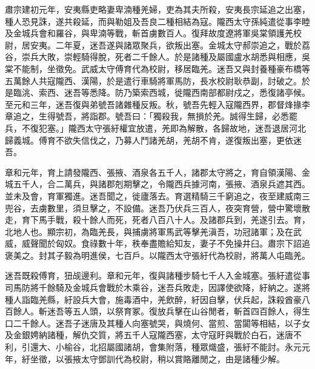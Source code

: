\begin{pinyinscope}
肅宗建初元年，安夷縣吏略妻卑湳種羌婦，吏為其夫所殺，安夷長宗延追之出塞，種人恐見誅，遂共殺延，而與勒姐及吾良二種相結為寇。隴西太守孫純遣從事李睦及金城兵會和羅谷，與卑湳等戰，斬首虜數百人。復拜故度遼將軍吳棠領護羌校尉，居安夷。二年夏，迷吾遂與諸眾聚兵，欲叛出塞。金城太守郝崇追之，戰於荔谷，崇兵大敗，崇輕騎得脫，死者二千餘人。於是諸種及屬國盧水胡悉與相應，吳棠不能制，坐徵免。武威太守傅育代為校尉，移居臨羌。迷吾又與封養種豪布橋等五萬餘人共寇隴西、漢陽，於是遣行車騎將軍馬防，長水校尉耿恭副，討破之。於是臨洮、索西、迷吾等悉降。防乃築索西城，徙隴西南部都尉戍之，悉復諸亭候。至元和三年，迷吾復與弟號吾諸雜種反叛。秋，號吾先輕入寇隴西界，郡督烽掾李章追之，生得號吾，將詣郡。號吾曰：「獨殺我，無損於羌。誠得生歸，必悉罷兵，不復犯塞。」隴西太守張紆權宜放遣，羌即為解散，各歸故地，迷吾退居河北歸義城。傅育不欲失信伐之，乃募人鬥諸羌胡，羌胡不肯，遂復叛出塞，更依迷吾。

章和元年，育上請發隴西、張掖、酒泉各五千人，諸郡太守將之，育自領漢陽、金城五千人，合二萬兵，與諸郡剋期擊之，令隴西兵據河南，張掖、酒泉兵遮其西。並未及會，育軍獨進。迷吾聞之，徙廬落去。育選精騎三千窮追之，夜至建威南三兜谷，去虜數里，須旦擊之，不設備。迷吾乃伏兵三百人，夜突育營，營中驚壞散走，育下馬手戰，殺十餘人而死，死者八百八十人。及諸郡兵到，羌遂引去。育，北地人也。顯宗初，為臨羌長，與捕虜將軍馬武等擊羌滇吾，功冠諸軍；及在武威，威聲聞於匈奴。食祿數十年，秩奉盡贍給知友，妻子不免操井臼。肅宗下詔追褒美之。封其子毅為明進侯，七百戶。以隴西太守張紆代為校尉，將萬人屯臨羌。

迷吾既殺傅育，狃觇邊利。章和元年，復與諸種步騎七千人入金城塞。張紆遣從事司馬防將千餘騎及金城兵會戰於木乘谷，迷吾兵敗走，因譯使欲降，紆納之。遂將種人詣臨羌縣，紆設兵大會，施毒酒中，羌飲醉，紆因自擊，伏兵起，誅殺酋豪八百餘人。斬迷吾等五人頭，以祭育冢。復放兵擊在山谷閒者，斬首四百餘人，得生口二千餘人。迷吾子迷唐及其種人向塞號哭，與燒何、當煎、當闐等相結，以子女及金銀娉納諸種，解仇交質，將五千人寇隴西塞，太守寇盱與戰於白石，迷唐不利，引還大、小榆谷，北招屬國諸胡，會集附落，種眾熾盛，張紆不能討。永元元年，紆坐徵，以張掖太守鄧訓代為校尉，稍以賞賂離閒之，由是諸種少解。


\end{pinyinscope}
